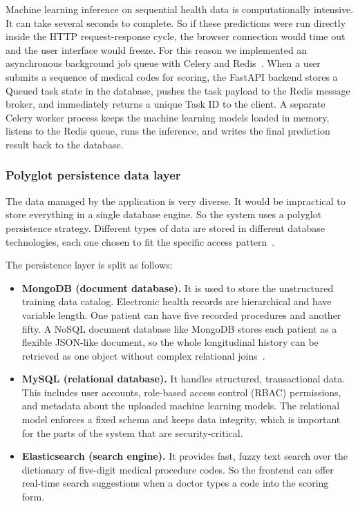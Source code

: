 Machine learning inference on sequential health data is computationally intensive. It can take several seconds to complete. So if these predictions were run directly inside the HTTP request-response cycle, the browser connection would time out and the user interface would freeze. For this reason we implemented an asynchronous background job queue with Celery and Redis~\cite{celery_redis_devto}. When a user submits a sequence of medical codes for scoring, the FastAPI backend stores a Queued task state in the database, pushes the task payload to the Redis message broker, and immediately returns a unique Task ID to the client. A separate Celery worker process keeps the machine learning models loaded in memory, listens to the Redis queue, runs the inference, and writes the final prediction result back to the database.

\subsubsection{Polyglot persistence data layer}
The data managed by the application is very diverse. It would be impractical to store everything in a single database engine. So the system uses a polyglot persistence strategy. Different types of data are stored in different database technologies, each one chosen to fit the specific access pattern~\cite{polyglot_dataexpert_2026}.

The persistence layer is split as follows:
\begin{itemize}
    \item \textbf{MongoDB (document database).} It is used to store the unstructured training data catalog. Electronic health records are hierarchical and have variable length. One patient can have five recorded procedures and another fifty. A NoSQL document database like MongoDB stores each patient as a flexible JSON-like document, so the whole longitudinal history can be retrieved as one object without complex relational joins~\cite{mongodb_healthcare}.
    \item \textbf{MySQL (relational database).} It handles structured, transactional data. This includes user accounts, role-based access control (RBAC) permissions, and metadata about the uploaded machine learning models. The relational model enforces a fixed schema and keeps data integrity, which is important for the parts of the system that are security-critical.
    \item \textbf{Elasticsearch (search engine).} It provides fast, fuzzy text search over the dictionary of five-digit medical procedure codes. So the frontend can offer real-time search suggestions when a doctor types a code into the scoring form.
\end{itemize}

